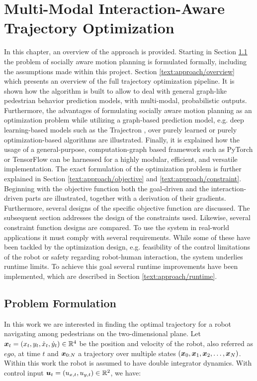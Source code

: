 \chapter{Multi-Modal Interaction-Aware Trajectory Optimization}
\label{text:approach}
In this chapter, an overview of the approach is provided. Starting in Section \ref{text:approach/formulation} the problem of socially aware motion planning is formulated formally, including the assumptions made within this project. 
\newline
Section \ref{text:approach/overview} which presents an overview of the full trajectory optimization pipeline. It is shown how the algorithm is built to allow to deal with general graph-like pedestrian behavior prediction models, with multi-modal, probabilistic outputs. Furthermore, the advantages of formulating socially aware motion planning as an optimization problem while utilizing a graph-based prediction model, e.g. deep learning-based models such as the Trajectron \cite{Ivanovic18}, over purely learned \cite{Chen2017} or purely optimization-based \cite{Berg2011} algorithms are illustrated. Finally, it is explained how the usage of a general-purpose, computation-graph based framework such as PyTorch \cite{pytorch} or TensorFlow \cite{tensorflow} can be harnessed for a highly modular, efficient, and versatile implementation.
\newline
The exact formulation of the optimization problem is further explained in Section \ref{text:approach/objective} and \ref{text:approach/constraint}. Beginning with the objective function both the goal-driven and the interaction-driven parts are illustrated, together with a derivation of their gradients. Furthermore, several designs of the specific objective function are discussed. The subsequent section addresses the design of the constraints used. Likewise, several constraint function designs are compared. 
\newline
To use the system in real-world applications it must comply with several requirements. While some of these have been tackled by the optimization design, e.g. feasibility of the control limitations of the robot or safety regarding robot-human interaction, the system underlies runtime limits. To achieve this goal several runtime improvements have been implemented, which are described in Section \ref{text:approach/runtime}.


\section{Problem Formulation}
\label{text:approach/formulation}
In this work we are interested in finding the optimal trajectory for a robot navigating among pedestrians on the two-dimensional plane. Let $\boldsymbol{x}_t = (x_t, y_t, \dot{x}_t, \dot{y}_t) \in \mathbb{R}^4 $ be the position and velocity of the robot, also referred as $ego$, at time $t$ and $\boldsymbol{x}_{0:N}$ a trajectory over multiple states $(\boldsymbol{x}_0, \boldsymbol{x}_1, \boldsymbol{x}_2, \hdots, \boldsymbol{x}_N)$. Within this work the robot is assumed to have double integrator dynamics. With control input $\boldsymbol{u}_t = (u_{x, t}, u_{y, t}) \in \mathbb{R}^2$, we have: 

